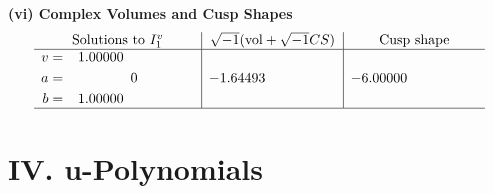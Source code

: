 \documentclass[1p]{elsarticle_modified}
\theoremstyle{definition}
\newcommand{\I}{\sqrt{-1}}
\begin{document}
\newpage\flushleft \textbf{(vi) Complex Volumes and Cusp Shapes}
$$\begin{array}{c|c|c}  
\text{Solutions to }I^v_{1}& \I (\text{vol} + \sqrt{-1}CS) & \text{Cusp shape}\\
 \hline 
\begin{aligned}
v &= \phantom{-}1.00000\phantom{ +0.000000I} \\
a &= \phantom{-0.000000 } 0 \\
b &= \phantom{-}1.00000\phantom{ +0.000000I}\end{aligned}
 & -1.64493\phantom{ +0.000000I} & -6.00000\phantom{ +0.000000I}\\
 \hline 
 \end{array}$$\newpage
\newpage\renewcommand{\arraystretch}{1}
\centering \section*{ IV. u-Polynomials}
\end{document}
